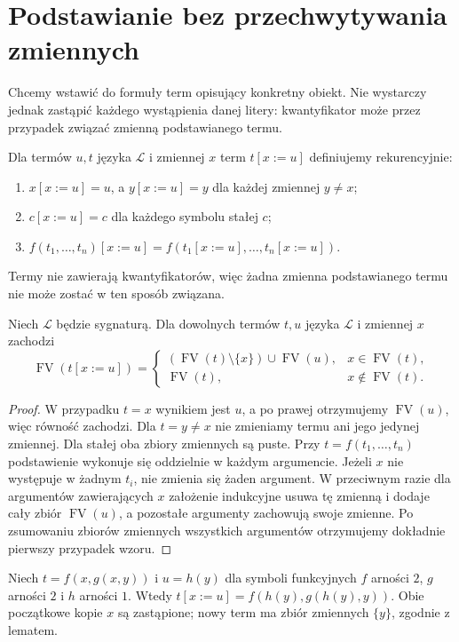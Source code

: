\section{Podstawianie bez przechwytywania zmiennych}
Chcemy wstawić do formuły term opisujący konkretny obiekt.
Nie wystarczy jednak zastąpić każdego wystąpienia danej litery:
kwantyfikator może przez przypadek związać zmienną podstawianego termu.

\begin{definicja}\label{def:syntax-term-substitution-xlv}
Dla termów $u,t$ języka $\mathcal L$ i zmiennej $x$
term $t[x:=u]$ definiujemy rekurencyjnie:
\begin{enumerate}[label=(\roman*)]
\item $x[x:=u]=u$, a $y[x:=u]=y$ dla każdej zmiennej $y\ne x$;
\item $c[x:=u]=c$ dla każdego symbolu stałej $c$;
\item $f(t_1,\ldots,t_n)[x:=u]
 =f(t_1[x:=u],\ldots,t_n[x:=u])$.
\end{enumerate}
Termy nie zawierają kwantyfikatorów, więc żadna zmienna
podstawianego termu nie może zostać w ten sposób związana.
\end{definicja}
\begin{lemat}
\label{lem:syntax-term-fv-subst-xlv}
Niech $\mathcal L$ będzie sygnaturą. Dla dowolnych termów
$t,u$ języka $\mathcal L$ i zmiennej $x$ zachodzi
\[
\operatorname{FV}(t[x:=u])=
\begin{cases}
(\operatorname{FV}(t)\setminus\{x\})\cup\operatorname{FV}(u),
 &x\in\operatorname{FV}(t),\\
\operatorname{FV}(t),&x\notin\operatorname{FV}(t).
\end{cases}
\]
\end{lemat}
\begin{proof}
W przypadku $t=x$ wynikiem jest $u$, a po prawej
otrzymujemy $\operatorname{FV}(u)$, więc równość zachodzi.
Dla $t=y\ne x$ nie zmieniamy termu ani jego jedynej
zmiennej. Dla stałej oba zbiory zmiennych są puste.
Przy $t=f(t_1,\ldots,t_n)$ podstawienie wykonuje się
oddzielnie w każdym argumencie. Jeżeli $x$ nie występuje
w żadnym $t_i$, nie zmienia się żaden argument.
W przeciwnym razie dla argumentów zawierających $x$
założenie indukcyjne usuwa tę zmienną i dodaje cały zbiór
$\operatorname{FV}(u)$, a pozostałe argumenty zachowują swoje
zmienne. Po zsumowaniu zbiorów zmiennych wszystkich
argumentów otrzymujemy dokładnie pierwszy przypadek wzoru.
\end{proof}
\begin{przyklad}
Niech $t=f(x,g(x,y))$ i $u=h(y)$ dla symboli funkcyjnych
$f$ arności $2$, $g$ arności $2$ i $h$ arności $1$.
Wtedy $t[x:=u]=f(h(y),g(h(y),y))$.
Obie początkowe kopie $x$ są zastąpione; nowy term ma
zbiór zmiennych $\{y\}$, zgodnie z lematem.
\end{przyklad}

